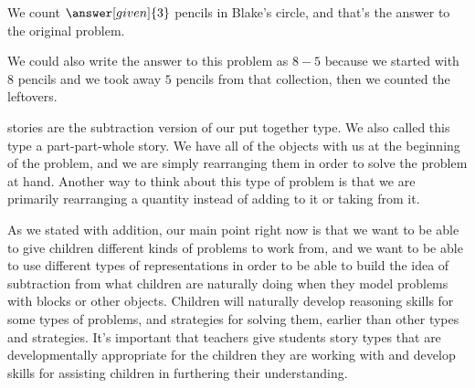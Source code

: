 \documentclass{ximera}
\begin{document}
\begin{example}
\begin{image}
 \end{image}

We count $\answer[given]{3}$ pencils in Blake's circle, and that's the answer to the original problem. 

We could also write the answer to this problem as $8-5$ because we started with $8$ pencils and we took away $5$ pencils from that collection, then we counted the leftovers.

\end{example}

  stories are the subtraction version of our put together type. We also called this type a part-part-whole story. We have all of the objects with us at the beginning of the problem, and we are simply rearranging them in order to solve the problem at hand.  Another way to think about this type of problem is that we are primarily rearranging a quantity instead of adding to it or taking from it.


As we stated with addition,  our main point right now is that we want to be able to give children different kinds of problems 
to work from, and we want to be able to use different types of representations in order to be able to build the idea of 
subtraction from what children are naturally doing when they model problems with blocks or other objects. Children will 
naturally develop reasoning skills for some types of problems, and strategies for solving them, earlier than other types 
and strategies. It's important that teachers give students story types that are developmentally appropriate for the children 
they are working with and develop skills for assisting children in furthering their understanding.
\end{document}
